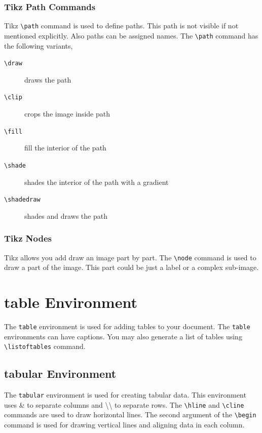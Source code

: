 \documentclass{article}
\theoremstyle{definition}
\theoremstyle{remark}
\begin{document}
\subsubsection{Tikz Path Commands}
	Tikz \texttt{\textbackslash path} command is used to define paths. This path is not visible if not mentioned explicitly. Also paths can be assigned names. The \texttt{\textbackslash path} command has the following variants,
\begin{description}
	\item[\texttt{\textbackslash draw}] draws the path
	\item[\texttt{\textbackslash clip}] crops the image inside path
	\item[\texttt{\textbackslash fill}] fill the interior of the path
	\item[\texttt{\textbackslash shade}] shades the interior of the path with a gradient
	\item[\texttt{\textbackslash shadedraw}] shades and draws the path
\end{description}


\subsubsection{Tikz Nodes}
	Tikz allows you add draw an image part by part. The \texttt{\textbackslash node} command is used to draw a part of the image. This part could be just a label or a complex sub-image.


\section{table Environment}
	The \texttt{table} environment is used for adding tables to your document. The \texttt{table} environments can have captions. You may also generate a list of tables using \texttt{\textbackslash listoftables} command.

\subsection{tabular Environment}
	The \texttt{tabular} environment is used for creating tabular data. This environment uses \& to separate columns and \textbackslash{}\textbackslash{} to separate rows. The \texttt{\textbackslash hline} and \texttt{\textbackslash cline} commands are used to draw horizontal lines. The second argument of the \texttt{\textbackslash begin} command is used for drawing vertical lines and aligning data in each column.
\end{document}
